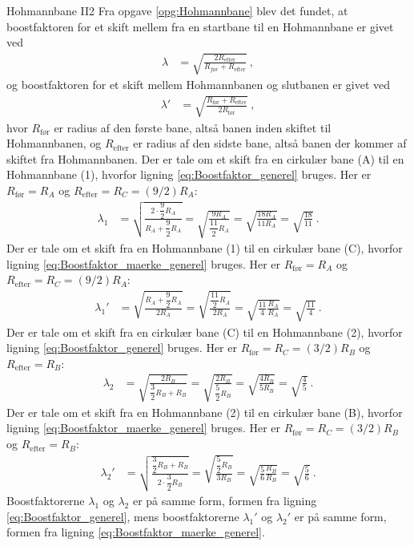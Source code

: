 %
%
\begin{opgave}{Hohmannbane II}{2}
Fra opgave \ref{opg:Hohmannbane} blev det fundet, at boostfaktoren for et skift mellem fra en startbane til en Hohmannbane er givet ved
\begin{align} \label{eq:Boostfaktor_generel}
	\lambda &= \sqrt{\frac{2R_{\text{efter}}}{R_{før}+R_{\text{efter}}}} \: ,
\end{align}
og boostfaktoren for et skift mellem Hohmannbanen og slutbanen er givet ved
\begin{align} \label{eq:Boostfaktor_maerke_generel}
	\lambda' &= \sqrt{\frac{R_{\text{før}}+R_{\text{efter}}}{2R_{\text{før}}}} \: ,
\end{align}
hvor $R_{\text{før}}$ er radius af den første bane, altså banen inden skiftet til Hohmannbanen, og $R_{\text{efter}}$ er radius af den sidste bane, altså banen der kommer af skiftet fra Hohmannbanen.
%
\opg Der er tale om et skift fra en cirkulær bane (A) til en Hohmannbane (1), hvorfor ligning \eqref{eq:Boostfaktor_generel} bruges. Her er $R_{\text{før}} = R_A$ og $R_{\text{efter}} = R_C = (9/2)R_A$:
\begin{align*}
	\lambda_1 &= \sqrt{\frac{2\cdot \dfrac{9}{2}R_A}{R_A+\dfrac{9}{2}R_A}}
	= \sqrt{\frac{9R_A}{\dfrac{11}{2}R_A}}
	= \sqrt{\frac{18R_A}{11R_A}}
	= \sqrt{\frac{18}{11}} \: .
\end{align*}
%
\opg Der er tale om et skift fra en Hohmannbane (1) til en cirkulær bane (C), hvorfor ligning \eqref{eq:Boostfaktor_maerke_generel} bruges. Her er $R_{\text{før}} = R_A$ og $R_{\text{efter}} = R_C = (9/2)R_A$:
\begin{align*}
	\lambda_1' &= \sqrt{\frac{R_A+\dfrac{9}{2}R_A}{2R_A}}
	= \sqrt{\frac{\dfrac{11}{2}R_A}{2R_A}}
	= \sqrt{\frac{11}{4}\frac{R_A}{R_A}}
	= \sqrt{\frac{11}{4}} \: .
\end{align*}
%
\opg Der er tale om et skift fra en cirkulær bane (C) til en Hohmannbane (2), hvorfor ligning \eqref{eq:Boostfaktor_generel} bruges. Her er $R_{\text{før}} = R_C = (3/2)R_B$ og $R_{\text{efter}} = R_B$:
\begin{align*}
	\lambda_2 &= \sqrt{\frac{2R_B}{\dfrac{3}{2}R_B+R_B}}
	= \sqrt{\frac{2R_B}{\dfrac{5}{2}R_B}}
	= \sqrt{\frac{4R_B}{5R_B}}
	= \sqrt{\frac{4}{5}} \: .
\end{align*}
\opg Der er tale om et skift fra en Hohmannbane (2) til en cirkulær bane (B), hvorfor ligning \eqref{eq:Boostfaktor_maerke_generel} bruges. Her er $R_{\text{før}} = R_C = (3/2)R_B$ og $R_{\text{efter}} = R_B$:
\begin{align*}
	\lambda_2' &= \sqrt{\frac{\dfrac{3}{2}R_B+R_B}{2\cdot\dfrac{3}{2}R_B}}
	= \sqrt{\frac{\dfrac{5}{2}R_B}{3R_B}}
	= \sqrt{\frac{5}{6}\frac{R_B}{R_B}}
	= \sqrt{\frac{5}{6}} \: .
\end{align*}
%
\opg Boostfaktorerne $\lambda_1$ og $\lambda_2$ er på samme form, formen fra ligning \eqref{eq:Boostfaktor_generel}, mens boostfaktorerne $\lambda_1'$ og $\lambda_2'$ er på samme form, formen fra ligning \eqref{eq:Boostfaktor_maerke_generel}.
\end{opgave}